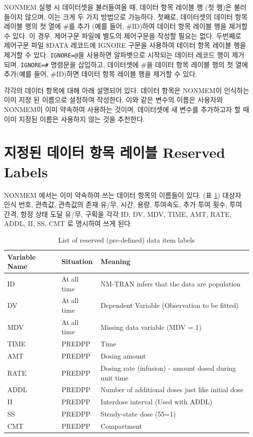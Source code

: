 \documentclass[
  10pt,
  krantz2,
  a4paper]{krantz}
\theoremstyle{definition}
\theoremstyle{definition}
\theoremstyle{definition}
\theoremstyle{remark}
\begin{document}
NONMEM 실행 시 데이터셋을 불러들여올 때, 데이터 항목 레이블 행 (첫 행)은 불러들이지 않으며, 이는 크게 두 가지 방법으로 가능하다. 첫째로, 데이터셋의 데이터 항목 레이블 행의 첫 열에 \#를 추가 (예를 들어, \#ID)하여 데이터 항목 레이블 행을 제거할 수 있다. 이 경우, 제어구문 파일에 별도의 제어구문을 작성할 필요는 없다. 두번째로 제어구문 파일 \$DATA 레코드에 IGNORE 구문을 사용하여 데이터 항목 레이블 행을 제거할 수 있다. \texttt{IGNORE=@}을 사용하면 알파벳으로 시작되는 데이터 레코드 행이 제거되며, \texttt{IGNORE=\#} 명령문을 삽입하고, 데이터셋에 \#을 데이터 항목 레이블 행의 첫 열에 추가(예를 들어, \#ID)하면 데이터 항목 레이블 행을 제거할 수 있다.

각각의 데이터 항목에 대해 아래 설명되어 있다. 데이터 항목은 NONMEM이 인식하는 이미 지정 된 이름으로 설정하여 작성한다. 이와 같은 변수의 이름은 사용자와 NONMEM이 이미 약속하여 사용하는 것이며, 데이터셋에 새 변수를 추가하고자 할 때 이미 지정된 이름은 사용하지 않는 것을 추천한다.

\hypertarget{uxc9c0uxc815uxb41c-uxb370uxc774uxd130-uxd56duxbaa9-uxb808uxc774uxbe14-reserved-labels}{%
\section{지정된 데이터 항목 레이블 Reserved Labels}\label{uxc9c0uxc815uxb41c-uxb370uxc774uxd130-uxd56duxbaa9-uxb808uxc774uxbe14-reserved-labels}}

NONMEM 에서는 이미 약속하여 쓰는 데이터 항목의 이름들이 있다. (표 \ref{tab:reserveditems}) 대상자 인식 번호, 관측값, 관측값의 존재 유/무, 시간, 용량, 투여속도, 추가 투여 횟수, 투여 간격, 항정 상태 도달 유/무, 구획을 각각 ID, DV, MDV, TIME, AMT, RATE, ADDL, II, SS, CMT 로 명시하여 쓰게 된다.

\begin{table}

\caption{\label{tab:reserveditems}List of reserved (pre-defined) data item labels}
\centering
\begin{tabular}[t]{lll}
\toprule
Variable Name & Situation & Meaning\\
\midrule
ID & At all time & NM-TRAN infers that the data are population\\
DV & At all time & Dependent Variable (Observation to be fitted)\\
MDV & At all time & Missing data variable (MDV = 1)\\
TIME & PREDPP & Time\\
AMT & PREDPP & Dosing amount\\
\addlinespace
RATE & PREDPP & Dosing rate (infusion) - amount dosed during unit time\\
ADDL & PREDPP & Number of additional doses just like initial dose\\
II & PREDPP & Interdose interval (Used with ADDL)\\
SS & PREDPP & Steady-state dose (55=1)\\
CMT & PREDPP & Compartment\\
\bottomrule
\end{tabular}
\end{table}
\end{document}
